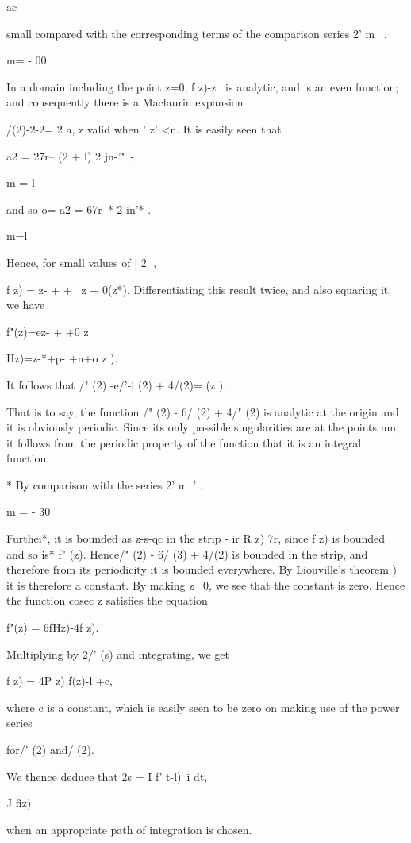 {ac

small compared with the corresponding terms of the comparison series
2' m~ .

m= - 00

In a domain including the point z=0, f z)-z~ is analytic, and is an
even function; and consequently there is a Maclaurin expansion

/(2)-2-2= 2 a, z valid when ' z' <n. It is easily seen that

a2 = 27r-- (2 + l) 2 jn-'"~-,

m = l

and so o= a2 = 67r~* 2 in'* .

m=l

Hence, for small values of | 2 |,

f z) = z- + + \ z + 0(z*). Differentiating this result twice, and also
squaring it, we have

f"(z)=ez- + +0 z%

 Hz)=z-*+p- +n+o z ).

It follows that /" (2) -e/'-i (2) + 4/(2)= (z ).

That is to say, the function /" (2) - 6/ (2) + 4/" (2) is analytic at
the origin and it is obviously periodic. Since its only possible
singularities are at the points mn, it follows from the periodic
property of the function that it is an integral function.

* By comparison with the series 2' m~' .

m = - 30

%
%

Furthei*, it is bounded as z-s-qc in the strip - ir R z) 7r, since f
z) is bounded and so is* f" (z). Hence/" (2) - 6/ (3) + 4/(2) is
bounded in the strip, and therefore from its periodicity it is bounded
everywhere. By Liouville's theorem ) it is therefore a
constant. By making z ~0, we see that the constant is zero. Hence the
function cosec z satisfies the equation

f"(z) = 6fHz)-4f z).

Multiplying by 2/' (s) and integrating, we get

f z) = 4P z) f(z)-l +c,

where c is a constant, which is easily seen to be zero on making use
of the power series

for/' (2) and/ (2).

We thence deduce that 2s = I f' t-l)~i dt,

J fiz)

when an appropriate path of integration is chosen.

}
